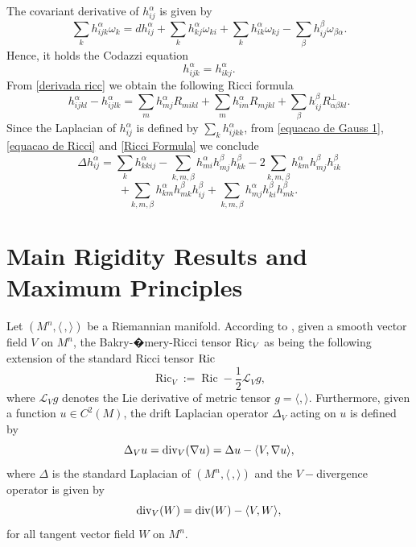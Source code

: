 \documentclass[leqno,11pt]{amsart}
\theoremstyle{plain}
\theoremstyle{definition}
\numberwithin{equation}{section}
\begin{document}
The covariant derivative of $h^\alpha_{ij}$ is given by
\begin{equation}\label{derivada ricc}
\sum_k h^\alpha_{ijk} \omega_k = dh^\alpha_{ij} + \sum_k h^\alpha_{kj} \omega_{ki} + \sum_k h^\alpha_{ik} \omega_{kj} - \sum_\beta h^\beta_{ij} \omega_{\beta\alpha}. \tag{1.4}
\end{equation}
Hence, it holds the Codazzi equation
\begin{equation}\label{codazzi equation}
h^\alpha_{ijk} = h^\alpha_{ikj}.
\end{equation}
From \eqref{derivada ricc} we obtain the following Ricci formula
\begin{equation}\label{Ricci Formula}
h^\alpha_{ijkl} - h^\alpha_{ijlk} = \sum_m h^\alpha_{mj} R_{mikl} + \sum_m h^\alpha_{im} R_{mjkl} + \sum_\beta h^\beta_{ij} R^\perp_{\alpha\beta kl}.
\end{equation}
Since the Laplacian of $h^\alpha_{ij}$ is defined by $\sum_k h^\alpha_{ijkk}$, from \eqref{equacao de Gauss 1}, \eqref{equacao de Ricci} and \eqref{Ricci Formula} we conclude
$$
\Delta h^\alpha_{ij} = \sum_k h^\alpha_{kkij} - \sum_{k,m,\beta} h^\alpha_{mi} h^\beta_{mj} h^\beta_{kk} - 2 \sum_{k,m,\beta} h^\alpha_{km} h^\beta_{mj} h^\beta_{ik} 
$$
\begin{equation}
+ \sum_{k,m,\beta} h^\alpha_{km} h^\beta_{mk} h^\beta_{ij} + \sum_{k,m,\beta} h^\alpha_{mj} h^\beta_{ki} h^\beta_{mk}. \tag{1.6}
\end{equation}


\section{Main Rigidity Results and Maximum Principles}\label{sec:proof}

Let $(M^n,\langle\,,\rangle)$ be a Riemannian manifold. According to \cite{QH:16}, given a smooth vector field $V$ on $M^n$, the Bakry-�mery-Ricci tensor ${\rm Ric}_V$ as being the following extension of the standard Ricci tensor ${\rm Ric}$
\begin{equation}\label{VRiccTensor}
	\operatorname{Ric}_V := \operatorname{Ric} - \frac{1}{2} \mathcal{L}_V g,
\end{equation}
where $\mathcal{L}_V g$ denotes the Lie derivative of metric tensor $g = \langle, \rangle$. Furthermore, given a function $u \in C^2(M)$, the drift Laplacian operator $\Delta_V$ acting on $u$ is defined by
\begin{equation}\label{Laplacians relation}
	{\Delta}_V u={\rm div}_V(\nabla u)=\Delta u-\langle V,\nabla u \rangle,
\end{equation}
where $\Delta$ is the standard Laplacian of $(M^n,\langle\,,\rangle)$ and the $V-$divergence operator is given by
\begin{equation}\label{div-f}
	{\rm div}_V(W)={\rm div}(W) - \langle V, W \rangle,
\end{equation}
for all tangent vector field $W$ on $M^n$.
\end{document}
